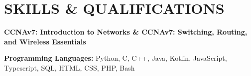 \section{\color{airforceblue}SKILLS \& QUALIFICATIONS}
\begin{itemize}[leftmargin=0in, label={}]
    \small{\item{
        \textbf{\normalsize{CCNAv7: Introduction to Networks \& CCNAv7: Switching, Routing, and Wireless Essentials }} \\
        \vspace{1.2pt}

        \textbf{\normalsize{Programming Languages:}}{ \normalsize{Python, C, C++, Java, Kotlin, JavaScript, Typescript, SQL, HTML, CSS, PHP, Bash}} \\
        \vspace{1.2pt}
    }}
\end{itemize}
\vspace{-16pt}